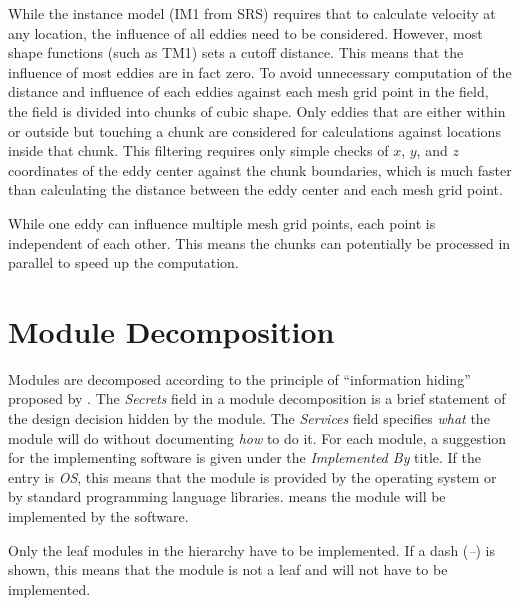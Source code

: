 \documentclass[12pt, titlepage]{article}
\begin{document}
While the instance model (IM1 from SRS) requires that to calculate velocity at any location, the influence of all eddies need to be considered. However, most shape functions (such as TM1) sets a cutoff distance. This means that the influence of most eddies are in fact zero. To avoid unnecessary computation of the distance and influence of each eddies against each mesh grid point in the field, the field is divided into chunks of cubic shape. Only eddies that are either within or outside but touching a chunk are considered for calculations against locations inside that chunk. This filtering requires only simple checks of $x$, $y$, and $z$ coordinates of the eddy center against the chunk boundaries, which is much faster than calculating the distance between the eddy center and each mesh grid point.

While one eddy can influence multiple mesh grid points, each point is independent of each other. This means the chunks can potentially be processed in parallel to speed up the computation.


\section{Module Decomposition} \label{SecMD}

Modules are decomposed according to the principle of ``information hiding''
proposed by \citet{ParnasEtAl1984}. The \emph{Secrets} field in a module
decomposition is a brief statement of the design decision hidden by the
module. The \emph{Services} field specifies \emph{what} the module will do
without documenting \emph{how} to do it. For each module, a suggestion for the
implementing software is given under the \emph{Implemented By} title. If the
entry is \emph{OS}, this means that the module is provided by the operating
system or by standard programming language libraries.  \emph{\progname{}} means the
module will be implemented by the \progname{} software.

Only the leaf modules in the hierarchy have to be implemented. If a dash
(\emph{--}) is shown, this means that the module is not a leaf and will not have
to be implemented.
\end{document}
